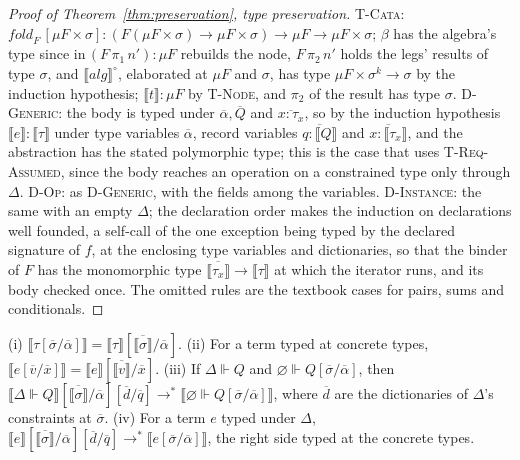 \begin{proof}[Proof of Theorem~\ref{thm:preservation}, type preservation]
\textsc{T-Cata}: $\mathit{fold}_F\,[\mu F \times \sigma] : (F(\mu F \times \sigma) \to \mu F \times \sigma) \to \mu F \to \mu F \times \sigma$; $\beta$ has the algebra's type since $\mathrm{in}\,(F\,\pi_1\,n') : \mu F$ rebuilds the node, $F\,\pi_2\,n'$ holds the legs' results of type $\sigma$, and $\llbracket \mathit{alg} \rrbracket^{\!\circ}$, elaborated at $\mu F$ and $\sigma$, has type $\mu F \times \sigma^{k} \to \sigma$ by the induction hypothesis; $\llbracket t \rrbracket : \mu F$ by \textsc{T-Node}, and $\pi_2$ of the result has type $\sigma$.
\textsc{D-Generic}: the body is typed under $\overline{\alpha}, \overline{Q}$ and $\overline{x : \tau_x}$, so by the induction hypothesis $\llbracket e \rrbracket : \llbracket \tau \rrbracket$ under type variables $\overline{\alpha}$, record variables $\overline{q : \llbracket Q \rrbracket}$ and $\overline{x : \llbracket \tau_x \rrbracket}$, and the abstraction has the stated polymorphic type; this is the case that uses \textsc{T-Req-Assumed}, since the body reaches an operation on a constrained type only through $\Delta$.
\textsc{D-Op}: as \textsc{D-Generic}, with the fields among the variables.
\textsc{D-Instance}: the same with an empty $\Delta$; the declaration order makes the induction on declarations well founded, a self-call of the one exception being typed by the declared signature of $f$, at the enclosing type variables and dictionaries, so that the binder of $F$ has the monomorphic type $\overline{\llbracket \tau_x \rrbracket} \to \llbracket \tau \rrbracket$ at which the iterator runs, and its body checked once.
The omitted rules are the textbook cases for pairs, sums and conditionals.
\end{proof}

\begin{lemma}
\label{lem:subst}
(i) $\llbracket \tau[\overline{\sigma}/\overline{\alpha}] \rrbracket = \llbracket \tau \rrbracket[\overline{\llbracket \sigma \rrbracket}/\overline{\alpha}]$.
(ii) For a term typed at concrete types, $\llbracket e[\overline{v}/\overline{x}] \rrbracket = \llbracket e \rrbracket[\overline{\llbracket v \rrbracket}/\overline{x}]$.
(iii) If $\Delta \Vdash Q$ and $\varnothing \Vdash Q[\overline{\sigma}/\overline{\alpha}]$, then $\llbracket \Delta \Vdash Q \rrbracket[\overline{\llbracket \sigma \rrbracket}/\overline{\alpha}][\overline{d}/\overline{q}] \longrightarrow^{*} \llbracket \varnothing \Vdash Q[\overline{\sigma}/\overline{\alpha}] \rrbracket$, where $\overline{d}$ are the dictionaries of $\Delta$'s constraints at $\overline{\sigma}$.
(iv) For a term $e$ typed under $\Delta$, $\llbracket e \rrbracket[\overline{\llbracket \sigma \rrbracket}/\overline{\alpha}][\overline{d}/\overline{q}] \longrightarrow^{*} \llbracket e[\overline{\sigma}/\overline{\alpha}] \rrbracket$, the right side typed at the concrete types.
\end{lemma}

